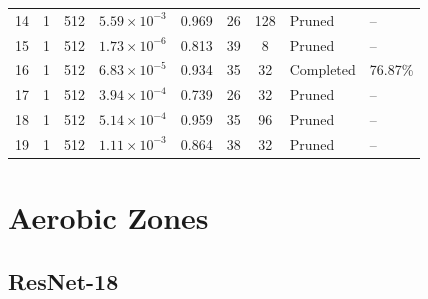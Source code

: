 {\begin{longtable}{lccccccll}
14 & 1 & 512 & $5.59\times10^{-3}$ & 0.969 & 26 & 128 & Pruned & -- \\
15 & 1 & 512 & $1.73\times10^{-6}$ & 0.813 & 39 & 8 & Pruned & -- \\
\rowcolor{gray!15} 16 & 1 & 512 & $6.83\times10^{-5}$ & 0.934 & 35 & 32 & Completed & 76.87\% \\
17 & 1 & 512 & $3.94\times10^{-4}$ & 0.739 & 26 & 32 & Pruned & -- \\
18 & 1 & 512 & $5.14\times10^{-4}$ & 0.959 & 35 & 96 & Pruned & -- \\
19 & 1 & 512 & $1.11\times10^{-3}$ & 0.864 & 38 & 32 & Pruned & -- \\
\end{longtable}
}

\Needspace*{0.6\textheight}
\section{Aerobic Zones}

\Needspace*{0.6\textheight}
\subsection{ResNet-18}

